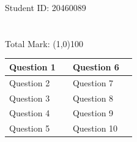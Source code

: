 \documentclass[12pt]{article}
\begin{document}
Student ID: 20460089
\\\\\\
Total Mark: \line(1,0){100}
\begin{center}
\begin{tabular}{| p{3cm}| p{3cm}| p{3cm}| p{3cm}|}
\hline
Question 1 & & Question 6 &  \\[1cm]
\hline
Question 2 & & Question 7 &  \\[1cm]
\hline
Question 3 & & Question 8 &  \\[1cm]
\hline
Question 4 & & Question 9 &  \\[1cm]
\hline
Question 5 & & Question 10 &  \\[1cm]
\hline
\end{tabular}
\end{center}
\newpage
\end{document}
